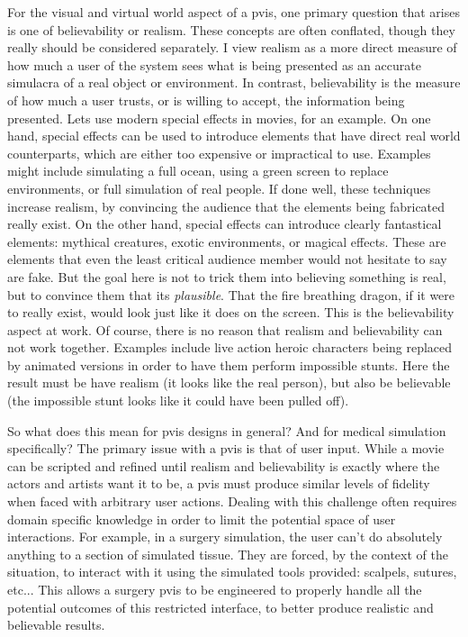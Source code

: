 \documentclass[12pt,oneside,letterpaper]{memoir}
\begin{document}
For the visual and virtual world aspect of a \gls{pvis}, one primary
question that arises is one of  believability or realism. These
concepts are often conflated, though they really should be considered
separately. I view realism as a more direct measure of how much a user
of the system sees what is being presented as an accurate simulacra of
a real object or environment. In contrast, believability is the
measure of how much a user trusts, or is willing to accept, the
information being presented. Lets use modern special effects in
movies, for an example. On one hand, special effects can be used to
introduce elements that have direct real world counterparts, which 
are either too expensive or impractical to use. Examples might include
simulating a full ocean, using a green screen to replace environments,
or full simulation of real people. If done well, these techniques
increase realism, by convincing the audience that the elements being
fabricated really exist. On the other hand, special effects can
introduce clearly fantastical elements: mythical creatures, exotic
environments, or magical effects. These are elements that even the
least critical audience member would not hesitate to say are fake. But
the goal here is not to trick them into believing something is real,
but to convince them that its \textit{plausible}. That the fire breathing
dragon, if it were to really exist, would look just like it does on
the screen. This is the believability aspect at work. Of course, there
is no reason that realism and believability can not work
together. Examples include live action heroic characters being
replaced by animated versions in order to have them perform impossible
stunts. Here the result must be have realism (it looks like the real
person), but also be believable (the impossible stunt looks like it
could have been pulled off).

So what does this mean for \gls{pvis} designs in general? And for medical
simulation specifically? The primary issue with a \gls{pvis} is that of user
input. While a movie can be scripted and refined until realism and
believability is exactly where the actors and artists want it to be, a
\gls{pvis} must produce similar levels of fidelity when faced with arbitrary
user actions. Dealing with this challenge often requires domain
specific knowledge in order to limit the potential space of user
interactions. For example, in a surgery simulation, the user can't do
absolutely anything to a section of simulated tissue. They are forced,
by the context of the situation, to interact with it using the
simulated tools provided: scalpels, sutures, etc... This allows a
surgery \gls{pvis} to be engineered to properly handle all the potential
outcomes of this restricted interface, to better produce realistic and
believable results.
\end{document}
